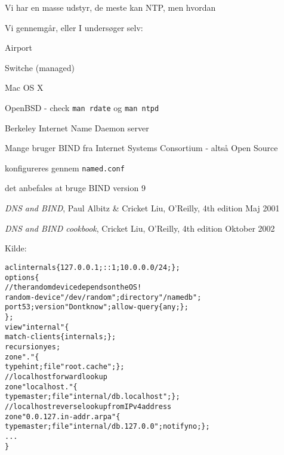 \documentclass[Screen16to9,17pt,footrule]{foils}
\begin{document}


\begin{list1}
\item Vi har en masse udstyr, de meste kan NTP, men hvordan
\item Vi gennemgår, eller I undersøger selv:
\begin{list2}
\item Airport
\item Switche (managed)
\item Mac OS X
\item OpenBSD - check \verb+man rdate+ og \verb+man ntpd+
\end{list2}
\end{list1}


\begin{list1}
\item Berkeley Internet Name Daemon server
\item Mange bruger BIND fra Internet Systems Consortium
   - altså Open Source
\item konfigureres gennem \verb+named.conf+
\item det anbefales at bruge BIND version 9
\end{list1}

\begin{list2}
\item \emph{DNS and BIND}, Paul Albitz \& Cricket Liu, O'Reilly, 4th
  edition Maj 2001
\item \emph{DNS and BIND cookbook}, Cricket Liu, O'Reilly, 4th
  edition Oktober 2002
\end{list2}

Kilde: 





\begin{alltt}
\small
acl internals \{ 127.0.0.1; ::1; 10.0.0.0/24; \};
options \{
        // the random device depends on the OS !
        random-device "/dev/random"; directory "/namedb";
        port 53; version "Dont know"; allow-query \{ any; \};
\};
view "internal" \{
   match-clients \{ internals; \};
   recursion yes;
   zone "." \{
       type hint;   file "root.cache"; \};
   // localhost forward lookup
   zone "localhost." \{
        type master; file "internal/db.localhost";   \};
   // localhost reverse lookup from IPv4 address
   zone "0.0.127.in-addr.arpa" \{
        type master; file "internal/db.127.0.0"; notify no;   \};
...
\}
\end{alltt}
\end{document}

